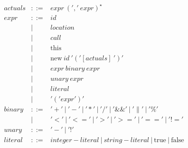 \documentclass{article}
\begin{document}
$$\begin{array}{rcl}
 actuals & ::= & expr ~(','~expr)^{\star}\\
 expr & ::= & id \\
 & | & location\\
 & | & call\\
 & | & \textrm{this} \\
 & | & \textrm{new} ~id ~'('[actuals]~')' \\
 & | & expr ~binary ~expr\\
 & | & unary ~expr\\
 & | & literal\\
 & | & '('expr')'\\
 binary & ::= & '+' ~|~ '-' ~|~ '*' ~|~ '/' ~|~ '\&\&' ~|~ '\|' ~|~ '\%' \\
 & | &  '<' ~|~ '<=' ~|~ '>' ~|~ '>=' ~|~ '==' ~|~ '!=' \\
 unary & ::= & '-' ~|~ '!' \\
 literal & ::= & integer-literal ~|~ string-literal ~|~ \textrm{true} ~|~ \textrm{false} \\
\end{array}
$$



{\footnotesize 

}

\end{document}
